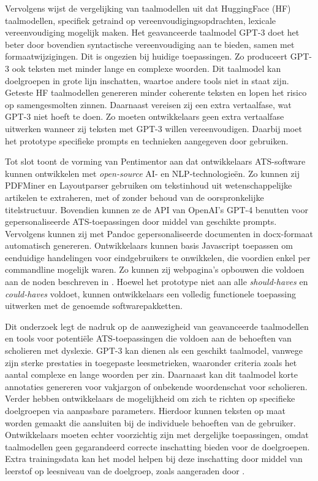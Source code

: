 Vervolgens wijst de vergelijking van taalmodellen uit dat HuggingFace (HF) taalmodellen, specifiek getraind op vereenvoudigingsopdrachten, lexicale vereenvoudiging mogelijk maken. Het geavanceerde taalmodel GPT-3 doet het beter door bovendien syntactische vereenvoudiging aan te bieden, samen met formaatwijzigingen. Dit is ongezien bij huidige toepassingen. Zo produceert GPT-3 ook teksten met minder lange en complexe woorden. Dit taalmodel kan doelgroepen in grote lijn inschatten, waartoe andere tools niet in staat zijn. Geteste HF taalmodellen genereren minder coherente teksten en lopen het risico op samengesmolten zinnen. Daarnaast vereisen zij een extra vertaalfase, wat GPT-3 niet hoeft te doen. Zo moeten ontwikkelaars geen extra vertaalfase uitwerken wanneer zij teksten met GPT-3 willen vereenvoudigen. Daarbij moet het prototype specifieke prompts en technieken aangegeven door \textcite{McFarland2023, White2023} gebruiken.

\medspace

Tot slot toont de vorming van Pentimentor aan dat ontwikkelaars ATS-software kunnen ontwikkelen met \textit{open-source} AI- en NLP-technologieën. Zo kunnen zij PDFMiner en Layoutparser gebruiken om tekstinhoud uit wetenschappelijke artikelen te extraheren, met of zonder behoud van de oorspronkelijke titelstructuur. Bovendien kunnen ze de API van OpenAI's GPT-4 benutten voor gepersonaliseerde ATS-toepassingen door middel van geschikte prompts. Vervolgens kunnen zij met Pandoc gepersonaliseerde documenten in docx-formaat automatisch genereren. Ontwikkelaars kunnen basis Javascript toepassen om eenduidige handelingen voor eindgebruikers te onwikkelen, die voordien enkel per commandline mogelijk waren. Zo kunnen zij webpagina's opbouwen die voldoen aan de noden beschreven in \textcite{Rello2012a}.  Hoewel het prototype niet aan alle \textit{should-haves} en \textit{could-haves} voldoet, kunnen ontwikkelaars een volledig functionele toepassing uitwerken met de genoemde softwarepakketten.

\medspace

Dit onderzoek legt de nadruk op de aanwezigheid van geavanceerde taalmodellen en tools voor potentiële ATS-toepassingen die voldoen aan de behoeften van scholieren met dyslexie. GPT-3 kan dienen als een geschikt taalmodel, vanwege zijn sterke prestaties in toegepaste leesmetrieken, waaronder criteria zoals het aantal complexe en lange woorden per zin. Daarnaast kan dit taalmodel korte annotaties genereren voor vakjargon of onbekende woordenschat voor scholieren. Verder hebben ontwikkelaars de mogelijkheid om zich te richten op specifieke doelgroepen via aanpasbare parameters. Hierdoor kunnen teksten op maat worden gemaakt die aansluiten bij de individuele behoeften van de gebruiker. Ontwikkelaars moeten echter voorzichtig zijn met dergelijke toepassingen, omdat taalmodellen geen gegarandeerd correcte inschatting bieden voor de doelgroepen. Extra trainingsdata kan het model helpen bij deze inschatting door middel van leerstof op leesniveau van de doelgroep, zoals aangeraden door \textcite{Gooding2022}.